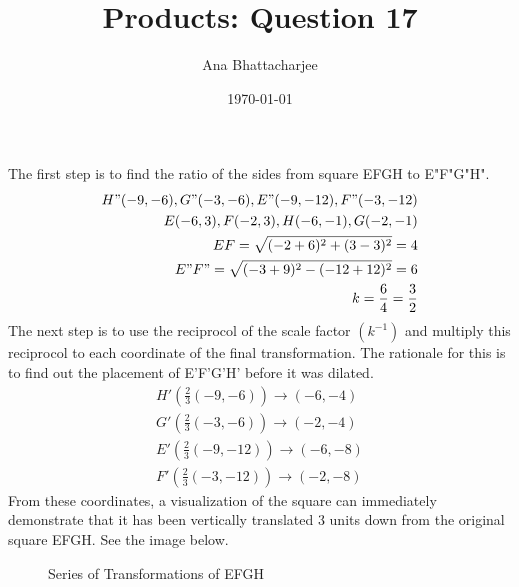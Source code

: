 \documentclass{article}
\begin{document}
\title{Products: Question 17}
\author{Ana Bhattacharjee}
\date{\today}
\maketitle{}

\begin{center}
The first step is to find the ratio of the sides from square EFGH to E"F"G"H".
\begin{align}
H" (-9, -6), G" (-3, -6), E" (-9, -12), F" (-3, -12) \\
E (-6, 3), F (-2, 3), H (-6, -1), G (-2, -1) \\
EF = \sqrt{(-2 + 6)^2 + (3 - 3)^2} = 4 \\
E"F" = \sqrt{(-3 + 9)^2 - (-12 + 12)^2} = 6 \\
k = \frac{6}{4} = \frac{3}{2} \\
\end{align}
The next step is to use the reciprocol of the scale factor $(k^{-1})$ and multiply this reciprocol to each coordinate of the final transformation. The rationale for this is to find out the placement of E'F'G'H' before it was dilated.
\begin{align}
H' (\frac{2}{3}(-9, -6)) \rightarrow (-6, -4) \\
G' (\frac{2}{3}(-3, -6)) \rightarrow (-2, -4 ) \\
E' (\frac{2}{3}(-9, -12)) \rightarrow (-6, -8) \\
F' (\frac{2}{3}(-3, -12)) \rightarrow (-2, -8)
\end{align}
From these coordinates, a visualization of the square can immediately demonstrate that it has been vertically translated 3 units down from the original square EFGH. See the image below.
\begin{figure}[!htbp]
  \caption{Series of Transformations of EFGH}
\end{figure}
\end{center}
\end{document}

